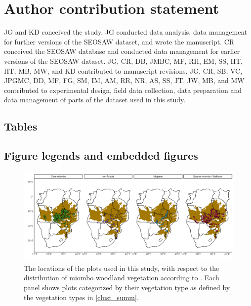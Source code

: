 \documentclass[11pt,a4paper]{article}
\begin{document}


\newpage{}

\section{Author contribution statement}

JG and KD conceived the study. JG conducted data analysis, data management for further versions of the SEOSAW dataset, and wrote the manuscript. CR conceived the SEOSAW database and conducted data management for earlier versions of the SEOSAW dataset. JG, CR, DB, JMBC, MF, RH, EM, SS, HT, HT, MB, MW, and KD contributed to manuscript revisions. JG, CR, SB, VC, JPGMC, DD, MF, FG, SM, IM, AM, RR, NR, AS, SS, JT, JW, MB, and MW contributed to experimental design, field data collection, data preparation and data management of parts of the dataset used in this study. 


\begin{landscape}
\section{Tables}

\end{landscape}



\begin{landscape}
\section{Figure legends and embedded figures}
\begin{figure}[H]
\centering
	\includegraphics[width=1.4\textwidth]{clust_map}
	\caption{The locations of the \nplots{} plots used in this study, with respect to the distribution of miombo woodland vegetation according to \citet{White1987}. Each panel shows plots categorized by their vegetation type as defined by the vegetation types in \autoref{clust_summ}.}
	\label{clust_map}
\end{figure}
\end{landscape}
\end{document}
